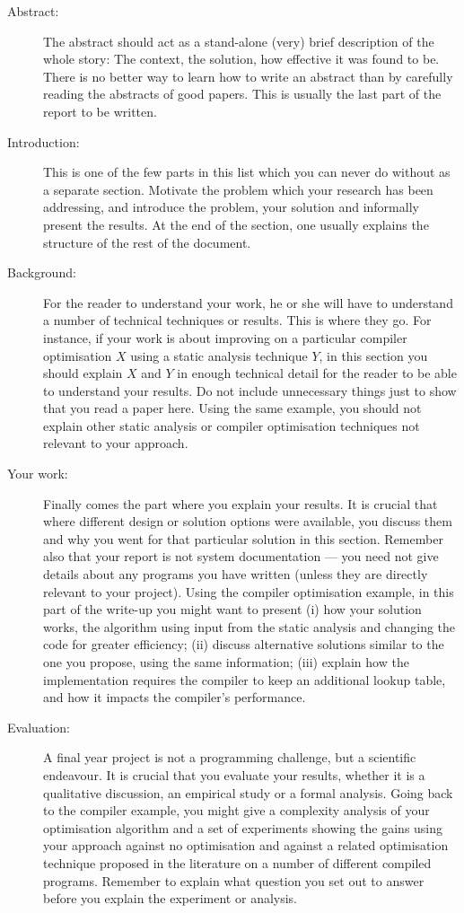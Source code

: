 \documentclass{csfyp}
\begin{document}
\begin{description}
\item[Abstract:] The abstract should act as a stand-alone (very) brief description of the whole story: The context, the solution, how effective it was found to be. There is no better way to learn how to write an abstract than by carefully reading the abstracts of good papers. This is usually the last part of the report to be written.
\item[Introduction:] This is one of the few parts in this list which you can never do without as a separate section. Motivate the problem which your research has been addressing, and introduce the problem, your solution and informally present the results. At the end of the section, one usually explains the structure of the rest of the document.
\item[Background:] For the reader to understand your work, he or she will have to understand a number of technical techniques or results. This is where they go. For instance, if your work is about improving on a particular compiler optimisation $X$ using a static analysis technique $Y$, in this section you should explain $X$ and $Y$ in enough technical detail for the reader to be able to understand your results. Do not include unnecessary things just to show that you read a paper here. Using the same example, you should not explain other static analysis or compiler optimisation techniques not relevant to your approach.
\item[Your work:] Finally comes the part where you explain your results. It is crucial that where different design or solution options were available, you discuss them and why you went for that particular solution in this section. Remember also that your report is not system documentation --- you need not give details about any programs you have written (unless they are directly relevant to your project). Using the compiler optimisation example, in this part of the write-up you might want to present (i) how your solution works, the algorithm using input from the static analysis and changing the code for greater efficiency; (ii) discuss alternative solutions similar to the one you propose, using the same information; (iii) explain how the implementation requires the compiler to keep an additional lookup table, and how it impacts the compiler's performance. 
\item[Evaluation:] A final year project is not a programming challenge, but a scientific endeavour. It is crucial that you evaluate your results, whether it is a qualitative discussion, an empirical study or a formal analysis. Going back to the compiler example, you might give a complexity analysis of your optimisation algorithm and a set of experiments showing the gains using your approach against no optimisation and against a related optimisation technique proposed in the literature on a number of different compiled programs. Remember to explain what question you set out to answer before you explain the experiment or analysis.

\end{description}
\end{document}

